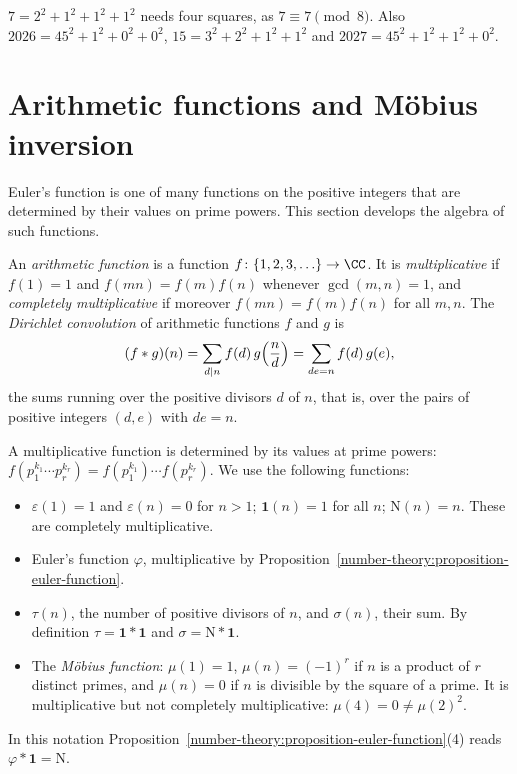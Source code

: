 \begin{example}\label{number-theory:example-four-squares}
$7 = 2^2 + 1^2 + 1^2 + 1^2$ needs four squares, as $7 \equiv 7 \pmod 8$. Also $2026 = 45^2 + 1^2 + 0^2 + 0^2$, $15 = 3^2 + 2^2 + 1^2 + 1^2$ and $2027 = 45^2 + 1^2 + 1^2 + 0^2$.
\end{example}

\section{Arithmetic functions and M\"obius inversion}\label{number-theory:section-arithmetic-functions}

Euler's function is one of many functions on the positive integers that are determined by their values on prime powers. This section develops the algebra of such functions.

\begin{definition}\label{number-theory:definition-arithmetic-function}
An \emph{arithmetic function} is a function $f \colon \{1, 2, 3, \ldots\} \to \CC$. It is \emph{multiplicative} if $f(1) = 1$ and $f(mn) = f(m)f(n)$ whenever $\gcd(m, n) = 1$, and \emph{completely
multiplicative} if moreover $f(mn) = f(m)f(n)$ for all $m, n$. The \emph{Dirichlet convolution} of arithmetic functions $f$ and $g$ is
\[
(f * g)(n) = \sum_{d \mid n}f(d)\,g\Bigl(\frac{n}{d}\Bigr) = \sum_{de = n}f(d)\,g(e),
\]
the sums running over the positive divisors $d$ of $n$, that is, over the pairs of positive integers $(d, e)$ with $de = n$.
\end{definition}

A multiplicative function is determined by its values at prime powers: $f(p_1^{k_1} \cdots p_r^{k_r}) = f(p_1^{k_1}) \cdots f(p_r^{k_r})$. We use the following functions:
\begin{itemize}
\item $\varepsilon(1) = 1$ and $\varepsilon(n) = 0$ for $n > 1$; $\mathbf{1}(n) = 1$ for all $n$; $\mathrm{N}(n) = n$. These are completely multiplicative.
\item Euler's function $\varphi$, multiplicative by Proposition~\ref{number-theory:proposition-euler-function}.
\item $\tau(n)$, the number of positive divisors of $n$, and $\sigma(n)$, their sum. By definition $\tau = \mathbf{1} * \mathbf{1}$ and $\sigma = \mathrm{N} * \mathbf{1}$.
\item The \emph{M\"obius function}: $\mu(1) = 1$, $\mu(n) = (-1)^r$ if $n$ is a product of $r$ distinct primes, and $\mu(n) = 0$ if $n$ is divisible by the square of a prime. It is multiplicative but not
completely multiplicative: $\mu(4) = 0 \neq \mu(2)^2$.
\end{itemize}
In this notation Proposition~\ref{number-theory:proposition-euler-function}(4) reads $\varphi * \mathbf{1} = \mathrm{N}$.

